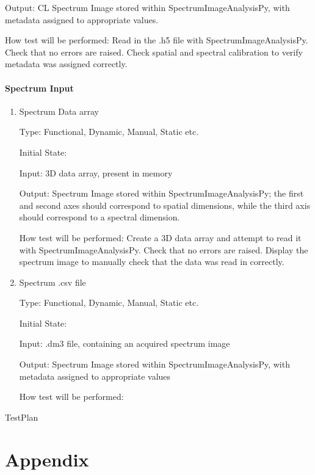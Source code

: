 \documentclass[12pt, titlepage]{article}
\newcommand{\progname}{SpectrumImageAnalysisPy}
\begin{document}
\begin{enumerate}
Output: CL Spectrum Image stored within \progname, with metadata assigned to appropriate values.
					
How test will be performed: Read in the .h5 file with \progname{}. Check that no errors are raised. Check spatial and spectral calibration to verify metadata was assigned correctly.

\end{enumerate}

\paragraph{Spectrum Input}

\begin{enumerate}

\item{Spectrum Data array\\}

Type: Functional, Dynamic, Manual, Static etc.
					
Initial State: 
					
Input: 3D data array, present in memory
					
Output: Spectrum Image stored within \progname{}; the first and second axes should correspond to spatial dimensions, while the third axis should correspond to a spectral dimension.
					
How test will be performed: Create a 3D data array and attempt to read it with \progname{}. Check that no errors are raised. Display the spectrum image to manually check that the data was read in correctly.


\item{Spectrum .csv file\\}

Type: Functional, Dynamic, Manual, Static etc.

Initial State: 

Input: .dm3 file, containing an acquired spectrum image

Output: Spectrum Image stored within \progname{}, with metadata assigned to appropriate values

How test will be performed: 

\end{enumerate}


 {TestPlan}

\newpage

\section{Appendix}
\end{document}
